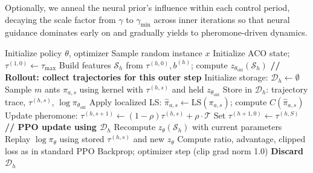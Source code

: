 \documentclass[sigconf,anonymous,review]{acmart}
\theoremstyle{definition}
\theoremstyle{plain}
\newcommand{\LGA}{\textsc{LGA}}
\begin{document}
Optionally, we anneal the neural prior's influence within each control period, decaying the scale factor from $\gamma$ to $\gamma_{\min}$ across inner iterations so that neural guidance dominates early on and gradually yields to pheromone-driven dynamics.

\begin{algorithm}[t]
\caption{PPO Training for \LGA{} (one outer step)}
\label{alg:train}
\begin{algorithmic}[1]
\STATE Initialize policy $\theta$, optimizer
        \STATE Sample random instance $x$
        \STATE Initialize ACO state; $\tau^{(1,0)} \leftarrow \tau_{\max}$
            \STATE Build features $\mathcal{S}_h$ from $\tau^{(h,0)}, b^{(h)}$; compute $z_{\theta_{\text{old}}}(\mathcal{S}_h)$
            \STATE \textbf{// Rollout: collect trajectories for this outer step}
            \STATE Initialize storage: $\mathcal{D}_h \leftarrow \emptyset$ 
                \STATE Sample $m$ ants $\pi_{a,s}$ using kernel with $\tau^{(h,s)}$ and held $z_{\theta_{\text{old}}}$
                \STATE Store in $\mathcal{D}_h$: trajectory trace, $\tau^{(h,s)}$, $\log \pi_{\theta_{\text{old}}}$
                \STATE Apply localized LS: $\hat{\pi}_{a,s} \leftarrow \mathrm{LS}(\pi_{a,s})$; compute $C(\hat{\pi}_{a,s})$
                \STATE Update pheromone: $\tau^{(h,s+1)} \leftarrow (1-\rho)\tau^{(h,s)} + \rho \cdot \mathcal{T}$
            \ENDFOR
            \STATE Set $\tau^{(h+1,0)} \leftarrow \tau^{(h,S)}$
            \STATE \textbf{// PPO update using $\mathcal{D}_h$}
                \STATE Recompute $z_\theta(\mathcal{S}_h)$ with current parameters
                    \STATE Replay $\log \pi_\theta$ using stored $\tau^{(h,s)}$ and new $z_\theta$
                    \STATE Compute ratio, advantage, clipped loss as in standard PPO
                \ENDFOR
                \STATE Backprop; optimizer step (clip grad norm 1.0)
            \ENDFOR
            \STATE \textbf{Discard $\mathcal{D}_h$} 
        \ENDFOR
    \ENDFOR
\ENDFOR
\end{algorithmic}
\end{algorithm}
\end{document}
